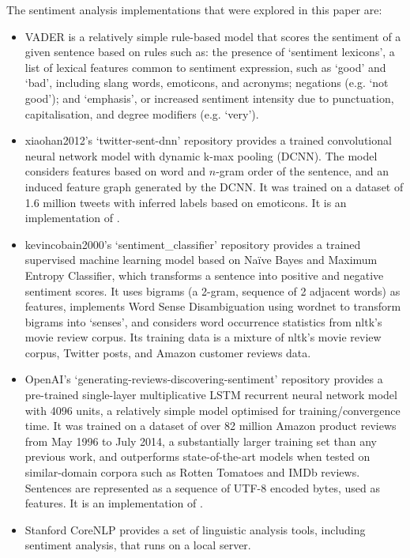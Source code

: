 \documentclass{report}
\begin{document}
The sentiment analysis implementations that were explored in this paper are:
\begin{itemize}
	\item VADER \cite{VADER} is a relatively simple rule-based model that scores the sentiment of a given sentence based on rules such as: the presence of `sentiment lexicons', a list of lexical features common to sentiment expression, such as `good' and `bad', including slang words, emoticons, and acronyms; negations (e.g. `not good'); and `emphasis', or increased sentiment intensity due to punctuation, capitalisation, and degree modifiers (e.g. `very').
	\item xiaohan2012's `twitter-sent-dnn' repository provides a trained convolutional neural network model with dynamic k-max pooling (DCNN).
		The model considers features based on word and $n$-gram order of the sentence, and an induced feature graph generated by the DCNN.
		It was trained on a dataset of 1.6 million tweets with inferred labels based on emoticons.
		It is an implementation of \cite{kalchbrennerACL2014}.
	\item kevincobain2000's `sentiment\_classifier' repository \cite{kevincobain} provides a trained supervised machine learning model based on Na\"{i}ve Bayes and Maximum Entropy Classifier, which transforms a sentence into positive and negative sentiment scores.
		It uses bigrams (a 2-gram, sequence of 2 adjacent words) as features, implements Word Sense Disambiguation using wordnet \cite{banerjee2002adapted} to transform bigrams into `senses', and considers word occurrence statistics from nltk's movie review corpus.
		Its training data is a mixture of nltk's movie review corpus, Twitter posts, and Amazon customer reviews data. 
	\item OpenAI's `generating-reviews-discovering-sentiment' repository provides a pre-trained single-layer multiplicative LSTM recurrent neural network model with 4096 units, a relatively simple model optimised for training/convergence time.
		It was trained on a dataset of over 82 million Amazon product reviews from May 1996 to July 2014, a substantially larger training set than any previous work, and outperforms state-of-the-art models when tested on similar-domain corpora such as Rotten Tomatoes and IMDb reviews.
		Sentences are represented as a sequence of UTF-8 encoded bytes, used as features. 
		It is an implementation of \cite{OpenAI}.
	\item Stanford CoreNLP \cite{StanfordNLP} provides a set of linguistic analysis tools, including sentiment analysis, that runs on a local server.

\end{itemize}
\end{document}
